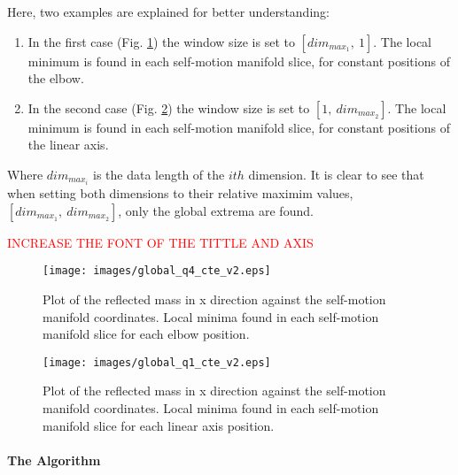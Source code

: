 Here, two examples are explained for better understanding:
\begin{enumerate}
	\item In the first case (Fig. \ref{fig:maxminfilter1}) the window size is set to $[dim_{max_{1}}, \ 1]$. The local minimum is found in each self-motion manifold slice, for constant positions of the elbow.
	\item In the second case (Fig. \ref{fig:maxminfilter2}) the window size is set to $[1, \ dim_{max_{2}}]$. The local minimum is found in each self-motion manifold slice, for constant positions of the linear axis.
	
\end{enumerate}

Where $dim_{max_{i}}$ is the data length of the $ith$ dimension. It is clear to see that when setting both dimensions to their relative maximim values, $[dim_{max_{1}}, \ dim_{max_{2}}]$, only the global extrema are found.

\textcolor{red}{INCREASE THE FONT OF THE TITTLE AND AXIS}

\begin{figure}[htb]
	\centerline{
		\texttt{[image: images/global\_q4\_cte\_v2.eps]}}
	\caption{Plot of the reflected mass in x direction against the self-motion
		manifold coordinates. Local minima found in each self-motion manifold slice for each elbow position. }
	\label{fig:maxminfilter1}
\end{figure}

\begin{figure}[htb]
	\centerline{
		\texttt{[image: images/global\_q1\_cte\_v2.eps]}}
	\caption{Plot of the reflected mass in x direction against the self-motion
		manifold coordinates. Local minima found in each self-motion manifold slice for each linear axis position. }
	\label{fig:maxminfilter2}
\end{figure}





\paragraph{The Algorithm}
\label{subsec:global_alg}

